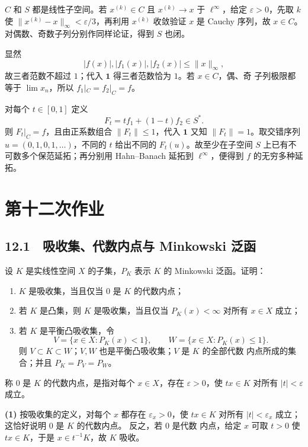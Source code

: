 $C$ 和 $S$ 都是线性子空间。若 $x^{(k)}\in C$ 且
$x^{(k)}\to x$ 于 $\ell^\infty$，给定 $\varepsilon>0$，先取 $k$ 使
$\|x^{(k)}-x\|_\infty<\varepsilon/3$，再利用 $x^{(k)}$ 收敛验证 $x$ 是 Cauchy
序列，故 $x\in C$。对偶数、奇数子列分别作同样论证，得到 $S$ 也闭。

显然
\[
 |f(x)|,|f_1(x)|,|f_2(x)|\le\|x\|_\infty,
\]
故三者范数不超过 $1$；代入 $\mathbf1$ 得三者范数恰为 $1$。若 $x\in C$，偶、奇
子列极限都等于 $\lim x_n$，所以 $f_1|_C=f_2|_C=f$。

对每个 $t\in[0,1]$ 定义
\[
 F_t=t f_1+(1-t)f_2\in S^*.
\]
则 $F_t|_C=f$，且由正系数组合 $\|F_t\|\le1$，代入 $\mathbf1$ 又知
$\|F_t\|=1$。取交错序列 $u=(0,1,0,1,\dots)$，不同的 $t$ 给出不同的
$F_t(u)$。故至少在子空间 $S$ 上已有不可数多个保范延拓；再分别用 Hahn--Banach
延拓到 $\ell^\infty$，便得到 $f$ 的无穷多种延拓。

\section{第十二次作业}

\subsection*{12.1　吸收集、代数内点与 Minkowski 泛函}

\begin{problem}
设 $K$ 是实线性空间 $X$ 的子集，$P_K$ 表示 $K$ 的 Minkowski 泛函。证明：
\begin{enumerate}
 \item $K$ 是吸收集，当且仅当 $0$ 是 $K$ 的代数内点；
 \item 若 $K$ 是凸集，则 $K$ 是吸收集，当且仅当
 $P_K(x)<\infty$ 对所有 $x\in X$ 成立；
 \item 若 $K$ 是平衡凸吸收集，令
 \[
  V=\{x\in X:P_K(x)<1\},\qquad W=\{x\in X:P_K(x)\le1\}.
 \]
 则 $V\subset K\subset W$；$V,W$ 也是平衡凸吸收集；$V$ 是 $K$ 的全部代数
 内点所成的集合；并且 $P_K=P_V=P_W$。
\end{enumerate}
\end{problem}

称 $0$ 是 $K$ 的代数内点，是指对每个 $x\in X$，存在 $\varepsilon>0$，使
$tx\in K$ 对所有 $|t|<\varepsilon$ 成立。

\textbf{(1)} 按吸收集的定义，对每个 $x$ 都存在 $\varepsilon_x>0$，使
$tx\in K$ 对所有 $|t|<\varepsilon_x$ 成立；这恰好说明 $0$ 是 $K$ 的代数内点。
反之，若 $0$ 是代数
内点，给定 $x$ 可取 $t>0$ 使 $tx\in K$，于是 $x\in t^{-1}K$，故 $K$ 吸收。

